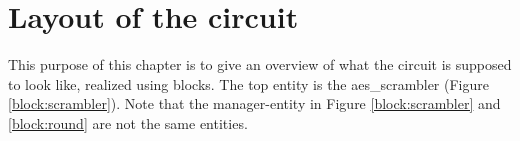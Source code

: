 \chapter*{Layout of the circuit} \label{app:blocks}
This purpose of this chapter is to give an overview of what the circuit is 
supposed to look like, realized using blocks. The top entity is the 
aes\_scrambler (Figure \ref{block:scrambler}). Note that the manager-entity in Figure \ref{block:scrambler} and 
\ref{block:round} are not the same entities.
